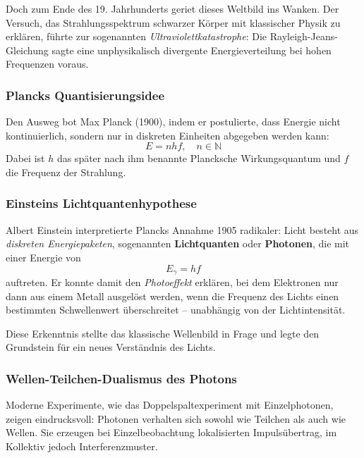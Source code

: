 Doch zum Ende des 19. Jahrhunderts geriet dieses Weltbild ins Wanken. Der Versuch, das Strahlungsspektrum schwarzer Körper mit klassischer Physik zu erklären, führte zur sogenannten \emph{Ultraviolettkatastrophe}: Die Rayleigh-Jeans-Gleichung sagte eine unphysikalisch divergente Energieverteilung bei hohen Frequenzen voraus.

\subsubsection{Plancks Quantisierungsidee}

Den Ausweg bot Max Planck (1900), indem er postulierte, dass Energie nicht kontinuierlich, sondern nur in diskreten Einheiten abgegeben werden kann:
\begin{equation}
	E = n h f, \quad n \in \mathbb{N}
\end{equation}
Dabei ist $h$ das später nach ihm benannte Plancksche Wirkungsquantum und $f$ die Frequenz der Strahlung.

\subsubsection{Einsteins Lichtquantenhypothese}

Albert Einstein interpretierte Plancks Annahme 1905 radikaler: Licht besteht aus \emph{diskreten Energiepaketen}, sogenannten \textbf{Lichtquanten} oder \textbf{Photonen}, die mit einer Energie von
\begin{equation}
	E_\gamma = h f
\end{equation}
auftreten. Er konnte damit den \emph{Photoeffekt} erklären, bei dem Elektronen nur dann aus einem Metall ausgelöst werden, wenn die Frequenz des Lichts einen bestimmten Schwellenwert überschreitet – unabhängig von der Lichtintensität.

Diese Erkenntnis stellte das klassische Wellenbild in Frage und legte den Grundstein für ein neues Verständnis des Lichts.

\subsubsection{Wellen-Teilchen-Dualismus des Photons}

Moderne Experimente, wie das Doppelspaltexperiment mit Einzelphotonen, zeigen eindrucksvoll: Photonen verhalten sich sowohl wie Teilchen als auch wie Wellen. Sie erzeugen bei Einzelbeobachtung lokalisierten Impulsübertrag, im Kollektiv jedoch Interferenzmuster.

